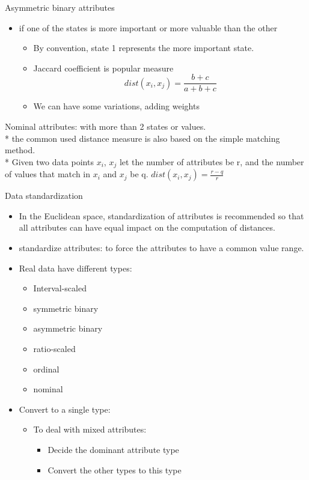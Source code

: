 \documentclass[
]{book}
\providecommand{\tightlist}{%
  \setlength{\itemsep}{0pt}\setlength{\parskip}{0pt}}
\begin{document}
Asymmetric binary attributes

\begin{itemize}
\item
  if one of the states is more important or more valuable than the other

  \begin{itemize}
  \tightlist
  \item
    By convention, state 1 represents the more important state.\\
  \item
    Jaccard coefficient is popular measure\\
    \[
    dist(x_i,x_j) = \frac{b + c}{a + b +c}
    \]
  \item
    We can have some variations, adding weights
  \end{itemize}
\end{itemize}

Nominal attributes: with more than 2 states or values.\\
* the common used distance measure is also based on the simple matching method.\\
* Given two data points \(x_i\), \(x_j\) let the number of attributes be r, and the number of values that match in \(x_i\) and \(x_j\) be q. \(dist(x_i,x_j) = \frac{r-q}{r}\)

Data standardization

\begin{itemize}
\item
  In the Euclidean space, standardization of attributes is recommended so that all attributes can have equal impact on the computation of distances.\\
\item
  standardize attributes: to force the attributes to have a common value range.\\
\item
  Real data have different types:

  \begin{itemize}
  \tightlist
  \item
    Interval-scaled
  \item
    symmetric binary
  \item
    asymmetric binary
  \item
    ratio-scaled
  \item
    ordinal
  \item
    nominal\\
  \end{itemize}
\item
  Convert to a single type:

  \begin{itemize}
  \item
    To deal with mixed attributes:

    \begin{itemize}
    \tightlist
    \item
      Decide the dominant attribute type
    \item
      Convert the other types to this type
    \end{itemize}
  \end{itemize}
\end{itemize}
\end{document}
